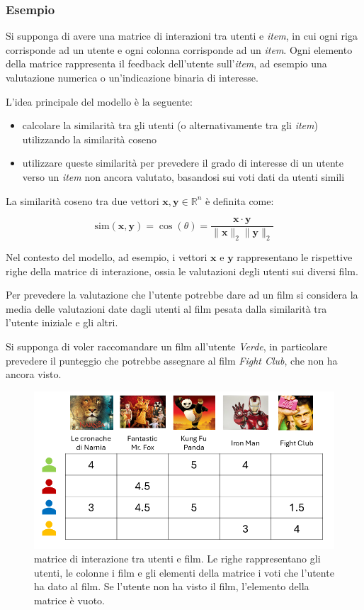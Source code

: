\subsubsection{Esempio}

Si supponga di avere una matrice di interazioni tra utenti e \textit{item}, in cui ogni riga corrisponde ad un utente e ogni colonna corrisponde ad un \textit{item}. Ogni elemento della matrice rappresenta il feedback dell'utente sull'\textit{item}, ad esempio una valutazione numerica o un'indicazione binaria di interesse.

L'idea principale del modello è la seguente:

\begin{itemize}
    \item calcolare la similarità tra gli utenti (o alternativamente tra gli \textit{item}) utilizzando la similarità coseno
    \item utilizzare queste similarità per prevedere il grado di interesse di un utente verso un \textit{item} non ancora valutato, basandosi sui voti dati da utenti simili
\end{itemize}

La similarità coseno tra due vettori \( \mathbf{x}, \mathbf{y} \in \mathbb{R}^n \) è definita come:

\[
\text{sim}(\mathbf{x}, \mathbf{y}) = \cos(\theta) = \frac{\mathbf{x} \cdot \mathbf{y}}{\|\mathbf{x}\|_2 \|\mathbf{y}\|_2}
\]

Nel contesto del modello, ad esempio, i vettori \( \mathbf{x} \) e \( \mathbf{y} \) rappresentano le rispettive righe della matrice di interazione, ossia le valutazioni degli utenti sui diversi film.

Per prevedere la valutazione che l'utente potrebbe dare ad un film si considera la media delle valutazioni date dagli utenti al film pesata dalla similarità tra l'utente iniziale e gli altri.

Si supponga di voler raccomandare un film all'utente \textit{Verde}, in particolare prevedere il punteggio che potrebbe assegnare al film \textit{Fight Club}, che non ha ancora visto.

\begin{figure}[H]
    \centering
    \includegraphics[scale=0.5]{figures/collaborative_filtering/interaction_matrix.png}
    \caption{matrice di interazione tra utenti e film. Le righe rappresentano gli utenti, le colonne i film e gli elementi della matrice i voti che l'utente ha dato al film. Se l'utente non ha visto il film, l'elemento della matrice è vuoto.}
\end{figure}

